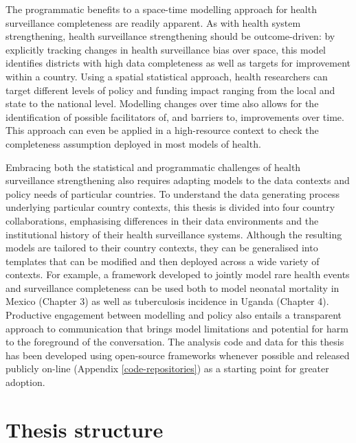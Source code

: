 \documentclass[
]{report}
\begin{document}
The programmatic benefits to a space-time modelling approach for health surveillance completeness are readily apparent. As with health system strengthening, health surveillance strengthening should be outcome-driven: by explicitly tracking changes in health surveillance bias over space, this model identifies districts with high data completeness as well as targets for improvement within a country. Using a spatial statistical approach, health researchers can target different levels of policy and funding impact ranging from the local and state to the national level. Modelling changes over time also allows for the identification of possible facilitators of, and barriers to, improvements over time. This approach can even be applied in a high-resource context to check the completeness assumption deployed in most models of health.

Embracing both the statistical and programmatic challenges of health surveillance strengthening also requires adapting models to the data contexts and policy needs of particular countries. To understand the data generating process underlying particular country contexts, this thesis is divided into four country collaborations, emphasising differences in their data environments and the institutional history of their health surveillance systems. Although the resulting models are tailored to their country contexts, they can be generalised into templates that can be modified and then deployed across a wide variety of contexts. For example, a framework developed to jointly model rare health events and surveillance completeness can be used both to model neonatal mortality in Mexico (Chapter 3) as well as tuberculosis incidence in Uganda (Chapter 4). Productive engagement between modelling and policy also entails a transparent approach to communication that brings model limitations and potential for harm to the foreground of the conversation.\autocite{Cinnamon2020a} The analysis code and data for this thesis has been developed using open-source frameworks whenever possible and released publicly on-line (Appendix \ref{code-repositories}) as a starting point for greater adoption.\autocite{Shannon2018}

\hypertarget{thesis-structure}{%
\section{Thesis structure}\label{thesis-structure}}
\end{document}
